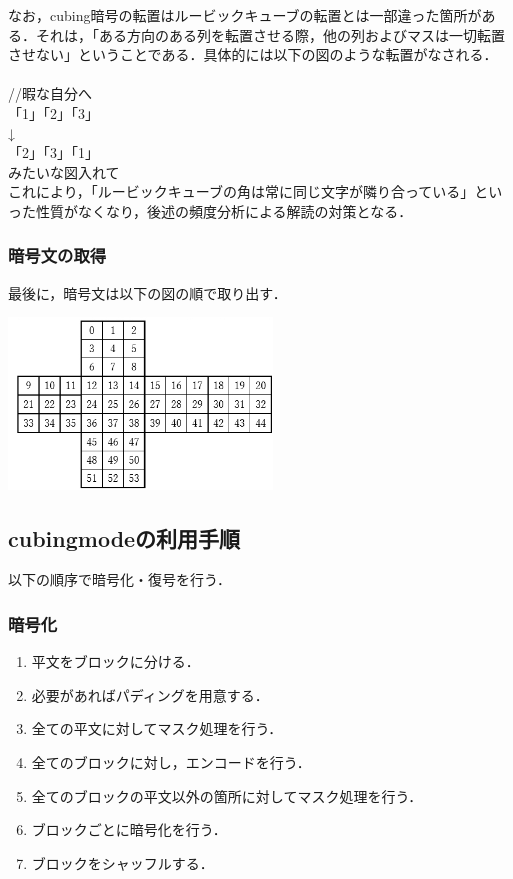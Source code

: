 \documentclass{jsarticle}
\begin{document}
なお，cubing暗号の転置はルービックキューブの転置とは一部違った箇所がある．それは，「ある方向のある列を転置させる際，他の列およびマスは一切転置させない」ということである．具体的には以下の図のような転置がなされる．\\
\\
//暇な自分へ\\
「1」「2」「3」\\
↓\\
「2」「3」「1」\\
みたいな図入れて\\

これにより，「ルービックキューブの角は常に同じ文字が隣り合っている」といった性質がなくなり，後述の頻度分析による解読の対策となる．


\subsubsection{暗号文の取得}
最後に，暗号文は以下の図の順で取り出す．
\begin{center}
  \includegraphics[width=7cm]{./tex_pic/seq.jpg}\\
\end{center}
\subsection{cubingmodeの利用手順}

以下の順序で暗号化・復号を行う．
\subsubsection{暗号化}
\begin{enumerate}
\item 平文をブロックに分ける．
\item 必要があればパディングを用意する．
\item 全ての平文に対してマスク処理を行う．
\item 全てのブロックに対し，エンコードを行う．
\item 全てのブロックの平文以外の箇所に対してマスク処理を行う．
\item ブロックごとに暗号化を行う．
\item ブロックをシャッフルする．
\end{enumerate}
\end{document}
